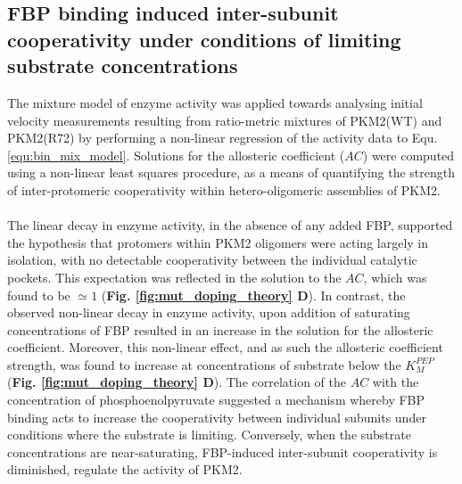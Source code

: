 \subsection{FBP binding induced inter-subunit cooperativity under conditions of limiting substrate concentrations}
The mixture model of enzyme activity was applied towards analysing initial velocity measurements resulting from ratio-metric mixtures of PKM2(WT) and PKM2(R72) by performing a non-linear regression of the activity data to Equ. \ref{equ:bin_mix_model}. Solutions for the allosteric coefficient ($AC$) were computed using a non-linear least squares procedure, as a means of quantifying the strength of inter-protomeric cooperativity within hetero-oligomeric assemblies of PKM2. 
%
%
\\\\
%
%
The linear decay in enzyme activity, in the absence of any added FBP, supported the hypothesis that protomers within PKM2 oligomers were acting largely in isolation, with no detectable cooperativity between the individual catalytic pockets. This expectation was reflected in the solution to the $AC$, which was found to be $\simeq 1$ (\textbf{Fig. \ref{fig:mut_doping_theory} D}). In contrast, the observed non-linear decay in enzyme activity, upon addition of saturating concentrations of FBP resulted in an increase in the solution for the allosteric coefficient. Moreover, this non-linear effect, and as such the allosteric coefficient strength, was found to increase at concentrations of substrate below the $K_{M}^{PEP}$ (\textbf{Fig. \ref{fig:mut_doping_theory} D}). The correlation of the $AC$ with the concentration of phosphoenolpyruvate suggested a mechanism whereby FBP binding acts to increase the cooperativity between individual subunits under conditions where the substrate is limiting. Conversely, when the substrate concentrations are near-saturating, FBP-induced inter-subunit cooperativity is diminished, regulate the activity of PKM2.
%
%
%
%
